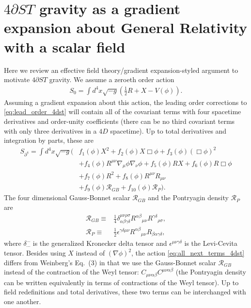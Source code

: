 \documentclass{ws-ijmpd}
\begin{document}
\section{$4\partial ST$ gravity as a gradient expansion about 
   General Relativity with a scalar field
   \label{sec:4dst_gradient_expansion}
}
   Here we review an effective field theory/gradient expansion-styled 
argument to motivate $4\partial ST$ 
gravity\cite{Weinberg:2008hq,Kovacs:2020pns,Kovacs:2020ywu}.
We assume a zeroeth order action
\begin{align}
\label{eq:lead_order_4dst}
   S_0
   =
   \int d^4x\sqrt{-g}\left(
      \frac{1}{2}R
      +
      X
      -
      V\left(\phi\right)
   \right)
   .
\end{align}
Assuming a gradient expansion about this action,
the leading order corrections to \eqref{eq:lead_order_4dst}
will contain all of the covariant terms with four spacetime derivatives
and order-unity coefficients (there can be no third covariant terms
with only three derivatives in a $4D$ spacetime).
Up to total derivatives and integration by parts, these are
\begin{align}
\label{eq:all_next_terms_4dst}
   S_{\partial^4}
   =
   \int d^4x\sqrt{-g}\Big(
      &
      f_1\left(\phi\right)X^2
      +
      f_2\left(\phi\right)X\Box\phi
      +
      f_3\left(\phi\right)\left(\Box\phi\right)^2
      \nonumber\\
      &+
      f_4\left(\phi\right)R^{\mu\nu}\nabla_{\mu}\phi\nabla_{\nu}\phi
      +
      f_5\left(\phi\right)RX
      +
      f_6\left(\phi\right)R\Box\phi
      \nonumber\\
      &+
      f_7\left(\phi\right)R^2
      +
      f_8\left(\phi\right)R^{\mu\nu}R_{\mu\nu}
      \nonumber\\
      &+
      f_9\left(\phi\right)\mathcal{R}_{GB}
      +
      f_{10}\left(\phi\right)\mathcal{R}_{P}
   \Big)
   .
\end{align}
The four dimensional Gauss-Bonnet scalar $\mathcal{R}_{GB}$ and the
Pontryagin density $\mathcal{R}_{P}$ are
\begin{align}
   \mathcal{R}_{GB}
   \equiv&
   \frac{1}{4}\delta^{\mu\nu\rho\sigma}_{\alpha\beta\gamma\delta}
   R^{\alpha\beta}{}_{\mu\nu}
   R^{\gamma\delta}{}_{\rho\sigma}
   ,\\ 
   \mathcal{R}_{P}
   \equiv&
   \frac{1}{2}
   \epsilon^{\gamma\delta\mu\nu}
   R^{\alpha\beta}{}_{\mu\nu}
   R_{\beta\alpha\gamma\delta}
   ,
\end{align}
where $\delta^{\cdots}_{\cdots}$ is the generalized Kronecker delta
tensor and $\epsilon^{\mu\nu\gamma\delta}$ is the Levi-Cevita tensor.
Besides using $X$ instead of $\left(\nabla\phi\right)^2$, the action
\eqref{eq:all_next_terms_4dst} differs from Weinberg's\cite{Weinberg:2008hq}
Eq.~(3) in that we use the Gauss-Bonnet scalar $\mathcal{R}_{GB}$ instead
of the contraction of the Weyl tensor:
$C_{\mu\nu\alpha\beta}C^{\mu\nu\alpha\beta}$
(the Pontryagin density can be written equivalently in terms
of contractions of the Weyl tensor\cite{Grumiller:2007rv}).
Up to field redefinitions and total derivatives, 
these two terms can be interchanged with one 
another\cite{Kovacs:2020pns,Kovacs:2020ywu}.
\end{document}
